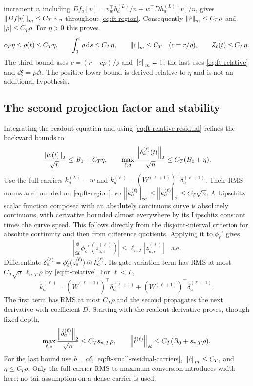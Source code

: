increment $v$, including
$Df_a[v]=v_w^\top h_a^{(L)}/n+w^\top Dh_a^{(L)}[v]/n$,
gives $\left\lVert Df[v]\right\rVert_m\le C_T|v|_n$ throughout \eqref{eq:ft-region}.
Consequently $\left\lVert \dot r\right\rVert_m\le C_T\rho$ and
$|\dot\rho|\le C_T\rho$.  For $\eta>0$ this proves
\begin{equation}
 c_T\eta\le\rho(t)\le C_T\eta,\qquad
 \int_0^t\rho\,\mathrm{d} s\le C_T\eta,\qquad
 \left\lVert \dot c\right\rVert_m\le C_T\quad(c=r/\rho),\qquad
 Z_\ell(t)\le C_T\eta.
 \label{eq:ft-relative-residual}
\end{equation}
The third bound uses $\dot c=(\dot r-c\dot\rho)/\rho$ and
$\left\lVert c\right\rVert_m=1$; the last uses \eqref{eq:ft-relative} and
$\dd\xi=\rho\dd t$.  The positive lower bound is derived relative
to $\eta$ and is not an additional hypothesis.

\subsection*{The second projection factor and stability}

Integrating the readout equation and using
\eqref{eq:ft-relative-residual} refines the backward bounds to
\begin{equation}
 \frac{\left\lVert w(t)\right\rVert_2}{\sqrt n}\le B_0+C_T\eta,
 \qquad\max_{\ell,a}\frac{\left\lVert \delta_a^{(\ell)}(t)\right\rVert_2}{\sqrt n}
                         \le C_T(B_0+\eta).
 \label{eq:ft-small-residual-carriers}
\end{equation}
Use the full carriers
$k_a^{(L)}=w$ and
$k_a^{(\ell)}=(W^{(\ell+1)})^\top\delta_a^{(\ell+1)}$.
Their RMS norms are bounded on \eqref{eq:ft-region}, so
$\left\lVert k_a^{(\ell)}\right\rVert_\infty\le\left\lVert k_a^{(\ell)}\right\rVert_2\le C_T\sqrt n$.
A Lipschitz scalar function composed with an absolutely continuous curve
is absolutely continuous, with derivative bounded almost everywhere by
its Lipschitz constant times the curve speed.  This follows directly
from the disjoint-interval criterion for absolute continuity and then
from difference quotients.  Applying it to $\phi_\ell'$ gives
\[
 \left|\frac{\dd}{\dd t}\phi_\ell'(z_{a,i}^{(\ell)})\right|
        \le\ell_{n,T}|\dot z_{a,i}^{(\ell)}|\quad\text{a.e.}
\]
Differentiate
$\delta_a^{(\ell)}=\phi_\ell'(z_a^{(\ell)})\mathbin{\odot} k_a^{(\ell)}$.
Its gate-variation term has RMS at most
$C_T\sqrt n\,\ell_{n,T}\rho$ by \eqref{eq:ft-relative}.
For $\ell<L$,
\[
 \dot k_a^{(\ell)}=(\dot W^{(\ell+1)})^\top\delta_a^{(\ell+1)}
                 +(W^{(\ell+1)})^\top\dot\delta_a^{(\ell+1)}.
\]
The first term has RMS at most $C_T\rho$ and the second propagates the
next derivative with coefficient $D$.  Starting with the readout
derivative proves, through fixed depth,
\[
 \max_{\ell,a}\frac{\left\lVert \dot\delta_a^{(\ell)}\right\rVert_2}{\sqrt n}
       \le C_Ts_{n,T}\rho,\qquad
 \left\lVert \dot b^{(\ell)}\right\rVert_{\mathcal H}
       \le C_T(B_0+s_{n,T}\rho).
\]
For the last bound use $b=c\delta$, \eqref{eq:ft-small-residual-carriers},
$\left\lVert \dot c\right\rVert_m\le C_T$, and $\eta\le C_T\rho$.
Only the full-carrier RMS-to-maximum conversion introduces width here;
no tail assumption on a dense carrier is used.

